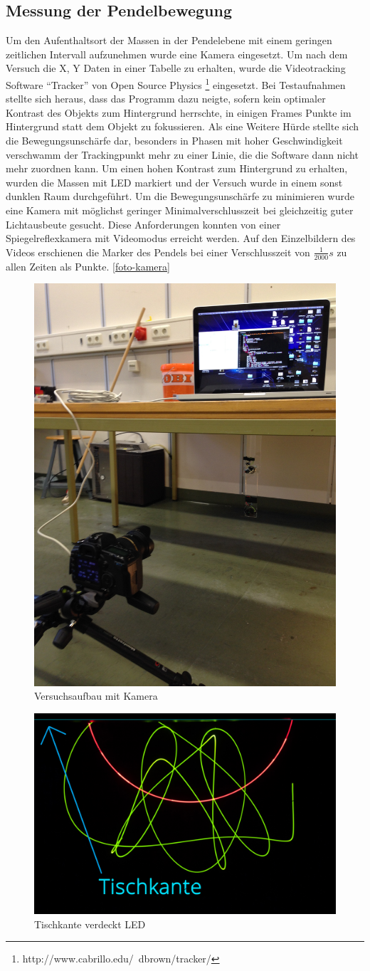 \subsection{Messung der Pendelbewegung}
Um den Aufenthaltsort der Massen in der Pendelebene mit einem geringen zeitlichen Intervall aufzunehmen wurde eine Kamera eingesetzt. Um nach dem Versuch die X, Y Daten in einer Tabelle zu erhalten, wurde die Videotracking Software \enquote{Tracker} von Open Source Physics \footnote{http://www.cabrillo.edu/~dbrown/tracker/} eingesetzt.
Bei Testaufnahmen stellte sich heraus, dass das Programm dazu neigte, sofern kein optimaler Kontrast des Objekts zum Hintergrund herrschte, in einigen Frames Punkte im Hintergrund statt dem Objekt zu fokussieren. Als eine Weitere Hürde stellte sich die Bewegungsunschärfe dar, besonders in Phasen mit hoher Geschwindigkeit verschwamm der Trackingpunkt mehr zu einer Linie, die die Software dann nicht mehr zuordnen kann. Um einen hohen Kontrast zum Hintergrund zu erhalten, wurden die Massen mit LED markiert und der Versuch wurde in einem sonst dunklen Raum durchgeführt. Um die Bewegungsunschärfe zu minimieren wurde eine Kamera mit möglichst geringer Minimalverschlusszeit bei gleichzeitig guter Lichtausbeute gesucht. Diese Anforderungen konnten von einer Spiegelreflexkamera mit Videomodus erreicht werden. Auf den Einzelbildern des Videos erschienen die Marker des Pendels bei einer Verschlusszeit von $\frac{1}{2000} s$ zu allen Zeiten als Punkte.
\ref{foto-kamera}
\begin{figure}
\centering
\includegraphics[width=.4\textwidth]{images/kamera}
\caption{Versuchsaufbau mit Kamera}
\label{photo-kamera}
\end{figure}
\begin{figure}
\centering
\includegraphics[width=.7\textwidth]{images/tischkante.jpg}
\caption{Tischkante verdeckt LED}
\label{tischkante}
\end{figure}
